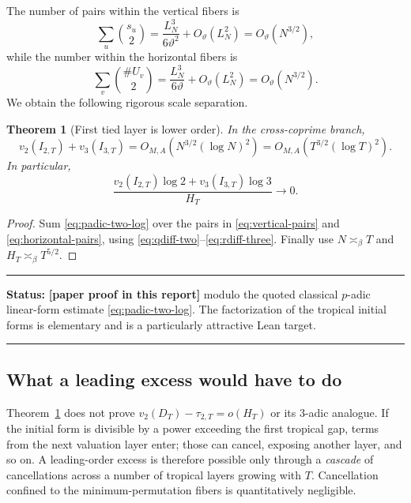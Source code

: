 \documentclass[11pt,oneside]{article}
\newtheorem{theorem}{Theorem}[section]
\theoremstyle{definition}
\theoremstyle{remark}
\newcommand{\statusnew}{\textcolor{newgreen}{\textbf{[paper proof in this report]}}}
\newenvironment{statusbox}[1]
{\begin{center}\begin{minipage}{0.94\textwidth}\raggedright\hbadness=10000\hrule
\vspace{0.45em}\textbf{Status:} #1\par\vspace{0.35em}}
{\vspace{0.35em}\hrule\end{minipage}\end{center}}
\begin{document}
The number of pairs within the vertical fibers is
\begin{equation}\label{eq:vertical-pairs}
 \sum_u\binom{s_u}{2}
 =\frac{L_N^3}{6\vartheta^2}+O_\vartheta(L_N^2)
 =O_\vartheta(N^{3/2}),
\end{equation}
while the number within the horizontal fibers is
\begin{equation}\label{eq:horizontal-pairs}
 \sum_v\binom{\#U_v}{2}
 =\frac{L_N^3}{6\vartheta}+O_\vartheta(L_N^2)
 =O_\vartheta(N^{3/2}).
\end{equation}
We obtain the following rigorous scale separation.

\begin{theorem}[First tied layer is lower order]\label{thm:first-layer-small}
In the cross-coprime branch,
\begin{equation}\label{eq:first-layer-small}
 v_2(I_{2,T})+v_3(I_{3,T})
 =O_{M,A}\!\left(N^{3/2}(\log N)^2\right)
 =O_{M,A}\!\left(T^{3/2}(\log T)^2\right).
\end{equation}
In particular,
\begin{equation}\label{eq:first-layer-negligible}
 \frac{v_2(I_{2,T})\log2+v_3(I_{3,T})\log3}{H_T}
 \longrightarrow0.
\end{equation}
\end{theorem}

\begin{proof}
Sum \eqref{eq:padic-two-log} over the pairs in
\eqref{eq:vertical-pairs} and \eqref{eq:horizontal-pairs}, using
\eqref{eq:qdiff-two}--\eqref{eq:rdiff-three}.  Finally use
$N\asymp_\beta T$ and $H_T\asymp_\beta T^{5/2}$.
\end{proof}

\begin{statusbox}{\statusnew{} modulo the quoted classical $p$-adic linear-form estimate
\eqref{eq:padic-two-log}.  The factorization of the tropical initial forms is elementary and
is a particularly attractive Lean target.}
\end{statusbox}

\subsection{What a leading excess would have to do}

Theorem~\ref{thm:first-layer-small} does not prove
$v_2(D_T)-\tau_{2,T}=o(H_T)$ or its $3$-adic analogue.  If the initial form is divisible by a
power exceeding the first tropical gap, terms from the next valuation layer enter; those can
cancel, exposing another layer, and so on.  A leading-order excess is therefore possible only
through a \emph{cascade} of cancellations across a number of tropical layers growing with
$T$.  Cancellation confined to the minimum-permutation fibers is quantitatively negligible.
\end{document}

